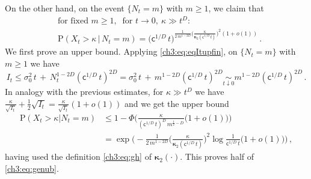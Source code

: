 \documentclass[a4paper,reqno,11pt]{amsart}
\numberwithin{equation}{section}
\newcommand{\PEfont}{\mathrm}
\renewcommand{\P}{\ensuremath{\PEfont P}}
\newcommand\sfc{\mathsf{c}}
\newcommand\bkappa{\boldsymbol{\kappa}}
\newcommand\blue{\color{blue}}
\begin{document}
On the other hand, on the event $\{N_t=m\}$ with $m \ge 1$,
we claim that
\begin{equation} \label{ch3:eq:genub}
\begin{split}
	& \text{for fixed } m \ge 1, \ \text{ for } t \to 0, \ \kappa \gg t^D: \\
	& \P(X_t >\kappa \,|\, N_t=m) =
	\big( \sfc^{1/D} \, t \big)^{\frac{1}{2 \, m^{1-2D}}
  \big(\frac{\kappa}{\bkappa_2(\sfc^{1/D} \, t)}\big)^2 
  (1+o(1))} \,.
\end{split}
\end{equation}
We first prove an upper bound. Applying \eqref{ch3:eq:eqItupfin},
on $\{N_t=m\}$ with $m \ge 1$ we have
\begin{equation*}
	I_t \le \sigma_0^2 \, t \,+\, N_t^{1-2D} (\sfc^{1/D} \, t)^{2D}
	= \sigma_0^2 \, t \,+\, m^{1-2D} (\sfc^{1/D} \, t)^{2D}
	\underset{t\downarrow 0}{\sim} 
	m^{1-2D} (\sfc^{1/D} \, t)^{2D} \,.
\end{equation*}
In analogy with the previous estimates, for $\kappa \gg t^D$ 
we have $\frac{\kappa}{\sqrt{I_t}} + \frac{1}{2} \sqrt{I_t}
= \frac{\kappa}{\sqrt{I_t}}(1+o(1))$ and
we get the upper bound
\begin{equation*}
\begin{split}
 \P(X_t >\kappa | N_t=m) & \leq 
 1 - \Phi\bigg(
	\frac{\kappa}{ (\sfc^{1/D} \, t)^D \, m^{\frac{1}{2}-D}}
  \big(1+o(1)\big) \bigg) \\
  & = \exp\bigg( -\frac{1}{2 \, m^{1-2D}}
  \bigg(\frac{\kappa}{\bkappa_2(\sfc^{1/D} \, t)}\bigg)^2 
  \log\frac{1}{ \sfc^{1/D} \, t}
  \big(1+o(1)\big)  \bigg)
  \,,
\end{split}
\end{equation*}
having used the definition \eqref{ch3:eq:gh} of $\bkappa_2(\cdot)$.
This proves half of \eqref{ch3:eq:genub}.
\end{document}
